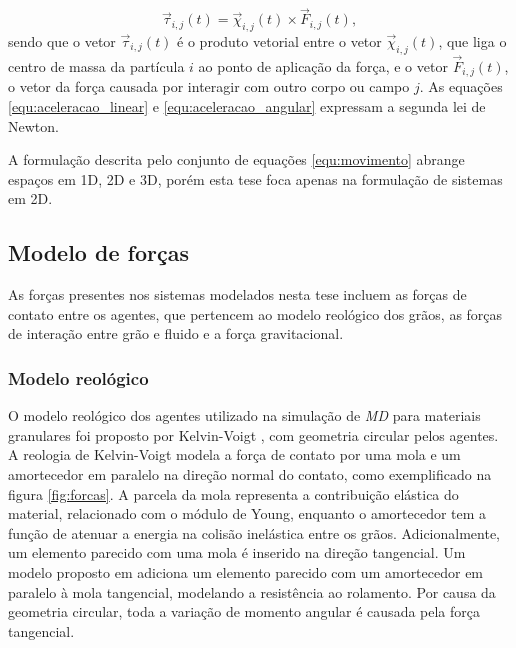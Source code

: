 \begin{equation}
    \label{equ:torque}
    \vec{\tau}_{i,j}(t) = \vec{\chi}_{i,j}(t) \times \vec{F}_{i,j}(t),
\end{equation}
sendo que o vetor $\vec{\tau}_{i,j}(t)$ é o produto vetorial entre o vetor $\vec{\chi}_{i,j}(t)$, que liga o centro de massa da partícula $i$ ao ponto de aplicação da força, e o vetor $\vec{F}_{i,j}(t)$, o vetor da força causada por interagir com outro corpo ou campo $j$. As equações \ref{equ:aceleracao_linear} e \ref{equ:aceleracao_angular} expressam a segunda lei de Newton.

    A formulação descrita pelo conjunto de equações \ref{equ:movimento} abrange espaços em 1D, 2D e 3D, porém esta tese foca apenas na formulação de sistemas em 2D.

\subsection{Modelo de forças}
\label{subchap:Modelo_Forcas}
    As forças presentes nos sistemas modelados nesta tese incluem as forças de contato entre os agentes, que pertencem ao modelo reológico dos grãos, as forças de interação entre grão e fluido e a força gravitacional.

\subsubsection{Modelo reológico}
\label{subsubchap:Reologia}
    O modelo reológico dos agentes utilizado na simulação de \textit{MD} para materiais granulares foi proposto por Kelvin-Voigt \cite{Dissertacao}, com geometria circular pelos agentes. A reologia de Kelvin-Voigt modela a força de contato por uma mola e um amortecedor em paralelo na direção normal do contato, como exemplificado na figura \ref{fig:forcas}. A parcela da mola representa a contribuição elástica do material, relacionado com o módulo de Young, enquanto o amortecedor tem a função de atenuar a energia na colisão inelástica entre os grãos. Adicionalmente, um elemento parecido com uma mola é inserido na direção tangencial. Um modelo proposto em \cite{Caio-Tese} adiciona um elemento parecido com um amortecedor em paralelo à mola tangencial, modelando a resistência ao rolamento. Por causa da geometria circular, toda a variação de momento angular é causada pela força tangencial.

